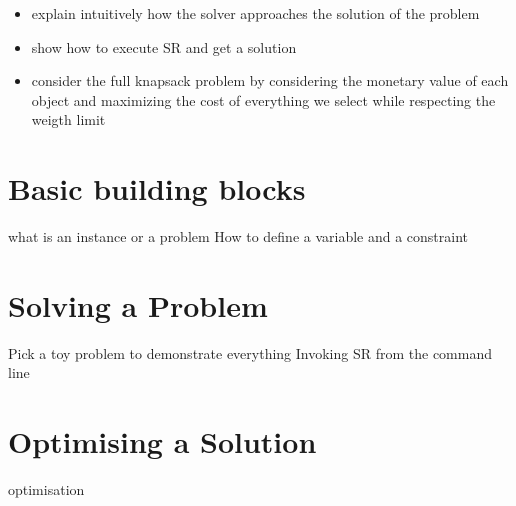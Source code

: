 \begin{itemize}
\item explain intuitively how the solver approaches the solution of the problem
\item show how to execute SR and get a solution
\item consider the full knapsack problem by considering the monetary value of each object
and maximizing the cost of everything we select while respecting the weigth limit
\end{itemize}

\section{Basic building blocks}
 what is an instance or a problem
How to define a variable and a constraint

\section{Solving a Problem}
Pick a toy problem to demonstrate everything
Invoking SR from the command line

\section{Optimising a Solution}
optimisation



